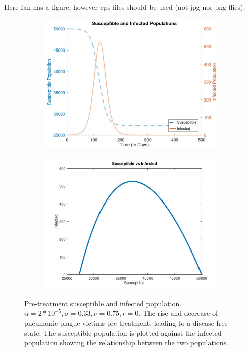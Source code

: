 \documentclass [letterpaper, 12pt] {article}
\begin{document}
Here Ian has a figure, however eps files should be used (not jpg nor png flies).
\begin{figure}[h!]
	\begin{subfigure}{0.48\textwidth}
		\includegraphics[width=\linewidth]{Figures/short_pneumonic.jpg}
	\end{subfigure}\hspace{\fill}
	\begin{subfigure}{0.48\textwidth}
		\includegraphics[width=\linewidth]{Figures/short_pneumonic2.jpg}
	\end{subfigure}
	\caption{Pre-treatment susceptible and infected population. $\alpha=2*10^{-5}, \sigma=0.33, \nu=0.75, r=0$.
	The rise and decrease of pneumonic plague victims pre-treatment, leading to a disease free state. The susceptible
	population is plotted against the infected population showing the relationship between the two populations.} 
\end{figure}
\end{document}
